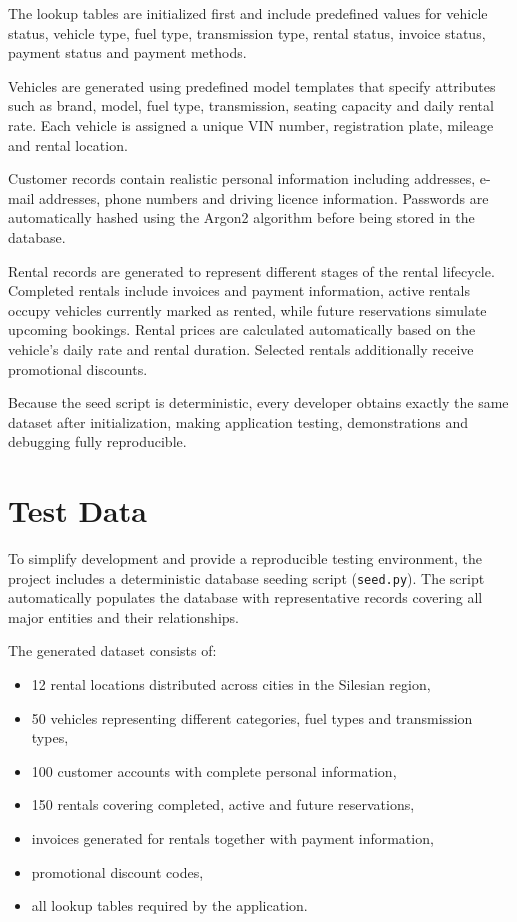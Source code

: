 The lookup tables are initialized first and include predefined values for vehicle status, vehicle type, fuel type, transmission type, rental status, invoice status, payment status and payment methods.

Vehicles are generated using predefined model templates that specify attributes such as brand, model, fuel type, transmission, seating capacity and daily rental rate. Each vehicle is assigned a unique VIN number, registration plate, mileage and rental location.

Customer records contain realistic personal information including addresses, e-mail addresses, phone numbers and driving licence information. Passwords are automatically hashed using the Argon2 algorithm before being stored in the database.

Rental records are generated to represent different stages of the rental lifecycle. Completed rentals include invoices and payment information, active rentals occupy vehicles currently marked as rented, while future reservations simulate upcoming bookings. Rental prices are calculated automatically based on the vehicle's daily rate and rental duration. Selected rentals additionally receive promotional discounts.

Because the seed script is deterministic, every developer obtains exactly the same dataset after initialization, making application testing, demonstrations and debugging fully reproducible.





\section{Test Data}

To simplify development and provide a reproducible testing environment, the project includes a deterministic database seeding script (\texttt{seed.py}). The script automatically populates the database with representative records covering all major entities and their relationships.

The generated dataset consists of:

\begin{itemize}
    \item 12 rental locations distributed across cities in the Silesian region,
    \item 50 vehicles representing different categories, fuel types and transmission types,
    \item 100 customer accounts with complete personal information,
    \item 150 rentals covering completed, active and future reservations,
    \item invoices generated for rentals together with payment information,
    \item promotional discount codes,
    \item all lookup tables required by the application.
\end{itemize}

